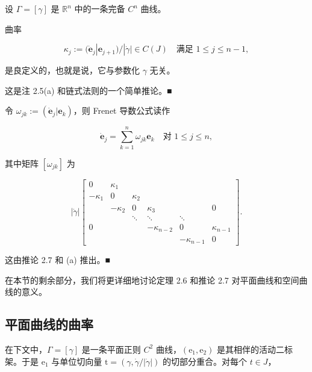 \begin{remark}

设 $ \Gamma = [\gamma] $ 是 $ \mathbb{R}^n $ 中的一条完备 $ C^n $ 曲线。

\begin{items}
\item

曲率

\[
\kappa_j := (\dot{\mathbf{e}}_j|\mathbf{e}_{j+1})/|\dot\gamma| \in C(J) \quad \text{满足 } 1 \le j \le n - 1 ,
\]

是良定义的，也就是说，它与参数化 $ \gamma $ 无关。

\proofhead
这是注 2.5(a) 和链式法则的一个简单推论。\nobreak\hspace{0.35em}■
\item

令 $ \omega_{jk} := (\dot{\mathbf{e}}_j|\mathbf{e}_k) $，则 Frenet 导数公式读作

\[
\dot{\mathbf{e}}_j = \sum_{k=1}^{n}\omega_{jk}\mathbf{e}_k \quad \text{对 } 1 \le j \le n ,
\]

其中矩阵 $ [\omega_{jk}] $ 为

\begin{equation*}
\left|\dot\gamma\right| \begin{bmatrix} 0 & \kappa_1 & & & & \\ -\kappa_1 & 0 & \kappa_2 & & & \\ & -\kappa_2 & 0 & \kappa_3 & & 0 \\ & & \ddots & \ddots & \ddots & \\ 0 & & & -\kappa_{n-2} & 0 & \kappa_{n-1} \\ & & & & -\kappa_{n-1} & 0 \end{bmatrix} .
\end{equation*}

\proofhead
这由推论 2.7 和 (a) 推出。\nobreak\hspace{0.35em}■
\end{items}

在本节的剩余部分，我们将更详细地讨论定理 2.6 和推论 2.7 对平面曲线和空间曲线的意义。

\end{remark}

\subsection*{平面曲线的曲率}

在下文中，$ \Gamma = [\gamma] $ 是一条平面正则 $ C^{2} $ 曲线，$ (\mathrm{e}_{1}, \mathrm{e}_{2}) $ 是其相伴的活动二标架。于是 $ \mathrm{e}_{1} $ 与单位切向量 $ \mathrm{t} = (\gamma, \dot{\gamma}/|\dot{\gamma}|) $ 的切部分重合。对每个 $ t \in J $，

